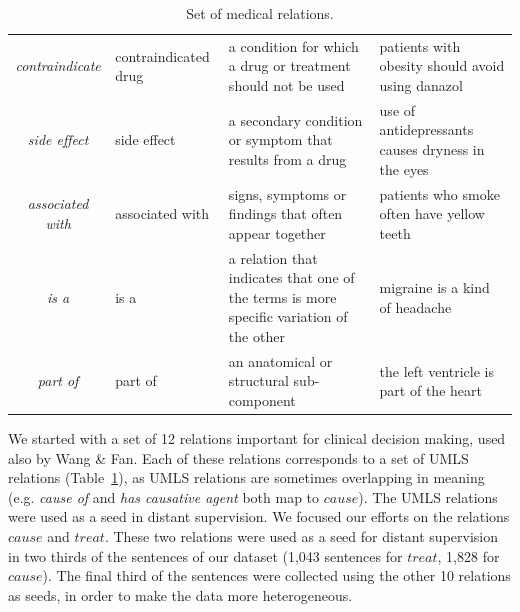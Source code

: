 \begin{table}[hbt!]
\begin{center}
{\begin{tabular}{cp{3.25cm}p{4.25cm}p{3.75cm}}
\cellcolor{aliceblue}\textit{contraindicate} & \cellcolor{aliceblue}contraindicated drug & \cellcolor{aliceblue}a condition for which a drug or treatment should not be used &  \cellcolor{aliceblue}patients with obesity should avoid using danazol \\  %

\textit{side effect} & side effect & a secondary condition or symptom that results from a drug %
&  use of antidepressants causes dryness in the eyes \\  %

\cellcolor{aliceblue}\textit{associated with} & \cellcolor{aliceblue}associated with & \cellcolor{aliceblue}signs, symptoms or findings that often appear together &  \cellcolor{aliceblue}patients who smoke often have yellow teeth \\  %

\textit{is a} & is a & a relation that indicates that one of the terms is more specific variation of the other &  migraine is a kind of headache \\  %

\cellcolor{aliceblue}\textit{part of} & \cellcolor{aliceblue}part of & \cellcolor{aliceblue}an anatomical or structural sub-component &  \cellcolor{aliceblue}the left ventricle is part of the heart \\  %
\bottomrule
\end{tabular}
}
\caption{Set of medical relations.}
\label{tab:relation_list}
\end{center}
\end{table}

We started with a set of 12 relations important for clinical decision making, used also by Wang \& Fan. Each of these relations corresponds to a set of UMLS relations (Table~\ref{tab:relation_list}), as UMLS relations are sometimes overlapping in meaning (e.g. \textit{cause of} and \textit{has causative agent} both map to $cause$). The UMLS relations were used as a seed in distant supervision. We focused our efforts on the relations $cause$ and $treat$. These two relations were used as a seed for distant supervision in two thirds of the sentences of our dataset (1,043 sentences for $treat$, 1,828 for $cause$). The final third of the sentences were collected using the other 10 relations as seeds, in order to make the data more heterogeneous.


